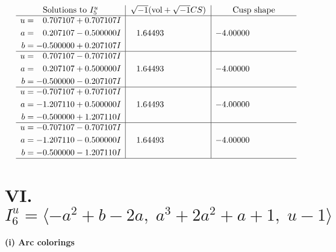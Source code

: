\documentclass[1p]{elsarticle_modified}
\theoremstyle{definition}
\newcommand{\I}{\sqrt{-1}}
\begin{document}
$$\begin{array}{c|c|c}  
\text{Solutions to }I^u_{5}& \I (\text{vol} + \sqrt{-1}CS) & \text{Cusp shape}\\
 \hline 
\begin{aligned}
u &= \phantom{-}0.707107 + 0.707107 I \\
a &= \phantom{-}0.207107 - 0.500000 I \\
b &= -0.500000 + 0.207107 I\end{aligned}
 & \phantom{-}1.64493\phantom{ +0.000000I} & -4.00000\phantom{ +0.000000I} \\ \hline\begin{aligned}
u &= \phantom{-}0.707107 - 0.707107 I \\
a &= \phantom{-}0.207107 + 0.500000 I \\
b &= -0.500000 - 0.207107 I\end{aligned}
 & \phantom{-}1.64493\phantom{ +0.000000I} & -4.00000\phantom{ +0.000000I} \\ \hline\begin{aligned}
u &= -0.707107 + 0.707107 I \\
a &= -1.207110 + 0.500000 I \\
b &= -0.500000 + 1.207110 I\end{aligned}
 & \phantom{-}1.64493\phantom{ +0.000000I} & -4.00000\phantom{ +0.000000I} \\ \hline\begin{aligned}
u &= -0.707107 - 0.707107 I \\
a &= -1.207110 - 0.500000 I \\
b &= -0.500000 - 1.207110 I\end{aligned}
 & \phantom{-}1.64493\phantom{ +0.000000I} & -4.00000\phantom{ +0.000000I}\\
 \hline 
 \end{array}$$\newpage\newpage\renewcommand{\arraystretch}{1}
\centering \section*{VI. $I^u_{6}= \langle - a^2+b-2 a,\;a^3+2 a^2+a+1,\;u-1 \rangle$}
\flushleft \textbf{(i) Arc colorings}\\
\end{document}
